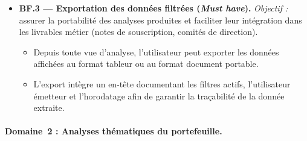 \documentclass[../main.tex]{subfiles}
\begin{document}
\begin{itemize}[leftmargin=1.5cm, itemsep=6pt]
  \item \textbf{BF.3 --- Exportation des données filtrées (\textit{Must have}).}
  \emph{Objectif :} assurer la portabilité des analyses produites et faciliter leur intégration dans les livrables métier (notes de souscription, comités de direction).
  \begin{itemize}[label=\textendash, itemsep=2pt]
    \item Depuis toute vue d'analyse, l'utilisateur peut exporter les données affichées au format tableur ou au format document portable.
    \item L'export intègre un en-tête documentant les filtres actifs, l'utilisateur émetteur et l'horodatage afin de garantir la traçabilité de la donnée extraite.
  \end{itemize}

\end{itemize}

\paragraph{Domaine~2 : Analyses thématiques du portefeuille.}
\end{document}
